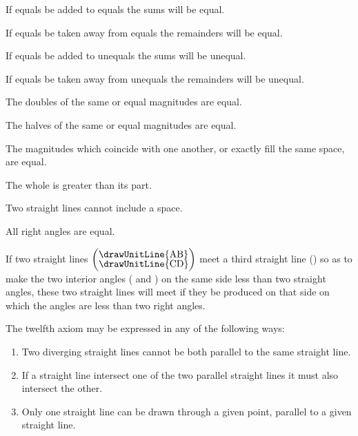 \documentclass[booklanguage=english]{byrnebook}
\begin{document}
\startaxiom{}
If equals be added to equals the sums will be equal.

\startaxiom{}
If equals be taken away from equals the remainders will be equal.

\startaxiom{}
If equals be added to unequals the sums will be unequal.

\startaxiom{}
If equals be taken away from unequals the remainders will be unequal.

\startaxiom{}
The doubles of the same or equal magnitudes are equal.

\startaxiom{}
The halves of the same or equal magnitudes are equal.

\startaxiom{}
The magnitudes which coincide with one another, or exactly fill the same space, are equal.

\startaxiom{}
The whole is greater than its part.

\startaxiom{}
Two straight lines cannot include a space.

\startaxiom{}
All right angles are equal.

\startaxiom{}
\drawCurrentPictureInMargin[inside]
If two straight lines $\left(\vcenter{\nointerlineskip\hbox{\drawUnitLine{AB}}\nointerlineskip\hbox{\drawUnitLine{CD}}}\right)$ meet a third straight line () so as to make the two interior angles ( and ) on the same side less than two straight angles, these two straight lines will meet if they be produced on that side on which the angles are less than two right angles.

The twelfth axiom may be expressed in any of the following ways:
\begin{enumerate}
\item Two diverging straight lines cannot be both parallel to the same straight line.
\item If a straight line intersect one of the two parallel straight lines it must also intersect the other.
\item Only one straight line can be drawn through a given point, parallel to a given straight line.
\end{enumerate}
\end{document}
